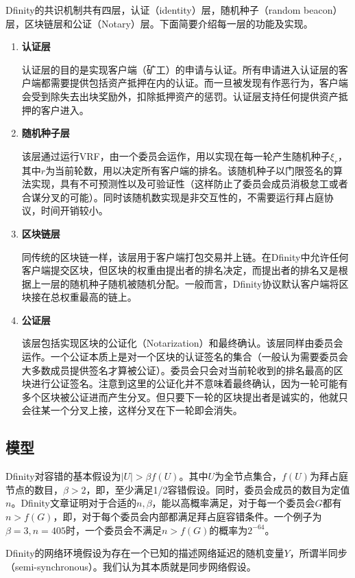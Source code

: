 Dfinity的共识机制共有四层，认证（identity）层，随机种子（random beacon）层，区块链层和公证（Notary）层。下面简要介绍每一层的功能及实现。
\begin{enumerate}
	\item \textbf{认证层}
	
	认证层的目的是实现客户端（矿工）的申请与认证。所有申请进入认证层的客户端都需要提供包括资产抵押在内的认证。而一旦被发现有作恶行为，客户端会受到除失去出块奖励外，扣除抵押资产的惩罚。认证层支持任何提供资产抵押的客户进入。
	
	\item \textbf{随机种子层}
	
	该层通过运行VRF，由一个委员会运作，用以实现在每一轮产生随机种子$\xi_r$，其中$r$为当前轮数，用以决定所有客户端的排名。该随机种子以门限签名的算法实现，具有不可预测性以及可验证性（这样防止了委员会成员消极怠工或者合谋分叉的可能）。同时该随机数实现是非交互性的，不需要运行拜占庭协议，时间开销较小。
	
	\item \textbf{区块链层}
	
	同传统的区块链一样，该层用于客户端打包交易并上链。在Dfinity中允许任何客户端提交区块，但区块的权重由提出者的排名决定，而提出者的排名又是根据上一层的随机种子随机被随机分配。一般而言，Dfinity协议默认客户端将区块接在总权重最高的链上。
	
	\item \textbf{公证层}
	
	该层包括实现区块的公证化（Notarization）和最终确认。该层同样由委员会运作。一个公证本质上是对一个区块的认证签名的集合（一般认为需要委员会大多数成员提供签名才算被公证）。委员会只会对当前轮收到的排名最高的区块进行公证签名。注意到这里的公证化并不意味着最终确认，因为一轮可能有多个区块被公证进而产生分叉。但只要下一轮的区块提出者是诚实的，他就只会往某一个分叉上接，这样分叉在下一轮即会消失。
\end{enumerate}

\subsection{模型}
Dfinity对容错的基本假设为$|U|>\beta  f(U)$。其中$U$为全节点集合，$f(U)$为拜占庭节点的数目，$\beta>2$，即，至少满足1/2容错假设。同时，委员会成员的数目为定值$n$。Dfinity文章证明对于合适的$n,\beta$，能以高概率满足，对于每一个委员会$G$都有$n>f(G)$，即，对于每个委员会内部都满足拜占庭容错条件。一个例子为$\beta=3,n=405$时，一个委员会不满足$n>f(G)$的概率为$2^{-64}$。

Dfinity的网络环境假设为存在一个已知的描述网络延迟的随机变量$Y$，所谓半同步（semi-synchronous）。我们认为其本质就是同步网络假设。

